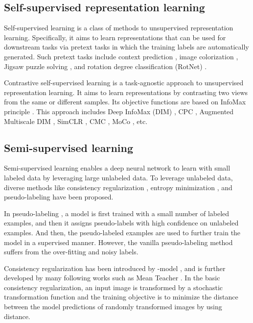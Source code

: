 \documentclass{article}
\begin{document}
\subsection{Self-supervised representation learning}

Self-supervised learning \cite{kolesnikov2019revisiting} is a class of methods to unsupervised representation learning. Specifically, it aims to learn representations that can be used for downstream tasks via pretext tasks in which the training labels are automatically generated. Such pretext tasks include context prediction \cite{doersch2015unsupervised}, image colorization \cite{zhang2016colorful}, Jigsaw puzzle solving \cite{noroozi2016unsupervised}, and rotation degree classification (RotNet) \cite{gidaris2018unsupervised}.

Contrastive self-supervised learning is a task-agnostic approach to unsupervised representation learning. It aims to learn representations by contrasting two views from the same or different samples. Its objective functions are based on InfoMax principle \cite{tschannen2020mutual}. This approach includes Deep InfoMax (DIM) \cite{hjelm2019learning}, CPC \cite{oord2018representation}, Augmented Multiscale DIM \cite{bachman2019learning}, SimCLR \cite{chen2020simple}, CMC \cite{tian2020contrastive}, MoCo \cite{he2020momentum}, etc.

\subsection{Semi-supervised learning}
Semi-supervised learning enables a deep neural network to learn with small labeled data by leveraging large unlabeled data. To leverage unlabeled data, diverse methods like consistency regularization \cite{sajjadi2016regularization}\cite{tarvainen2017mean}\cite{laine2016temporal}, entropy minimization \cite{grandvalet2005semi}, and pseudo-labeling \cite{lee2013pseudo} have been proposed.

In pseudo-labeling \cite{lee2013pseudo}, a model is first trained with a small number of labeled examples, and then it assigns pseudo-labels with high confidence on unlabeled examples. And then, the pseudo-labeled examples are used to further train the model in a supervised manner. However, the vanilla pseudo-labeling method suffers from the over-fitting and noisy labels. 

Consistency regularization has been introduced by -model \cite{sajjadi2016regularization}, and is further developed by many following works such as Mean Teacher \cite{tarvainen2017mean}\cite{laine2016temporal}. In the basic consistency regularization, an input image is transformed by a stochastic transformation function and the training objective is to minimize the distance between the model predictions of randomly transformed images by using  distance. 
\end{document}
